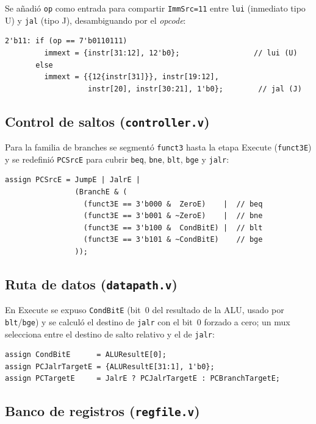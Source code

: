 \documentclass[11pt,a4paper]{article}
\begin{document}
Se añadió \texttt{op} como entrada para compartir \texttt{ImmSrc=11} entre \texttt{lui}
(inmediato tipo U) y \texttt{jal} (tipo J), desambiguando por el \textit{opcode}:

\begin{lstlisting}
2'b11: if (op == 7'b0110111)
         immext = {instr[31:12], 12'b0};                 // lui (U)
       else
         immext = {{12{instr[31]}}, instr[19:12],
                   instr[20], instr[30:21], 1'b0};        // jal (J)
\end{lstlisting}

\subsection{Control de saltos (\texttt{controller.v})}

Para la familia de branches se segmentó \texttt{funct3} hasta la etapa Execute
(\texttt{funct3E}) y se redefinió \texttt{PCSrcE} para cubrir \texttt{beq}, \texttt{bne},
\texttt{blt}, \texttt{bge} y \texttt{jalr}:

\begin{lstlisting}
assign PCSrcE = JumpE | JalrE |
                (BranchE & (
                  (funct3E == 3'b000 &  ZeroE)    |  // beq
                  (funct3E == 3'b001 & ~ZeroE)    |  // bne
                  (funct3E == 3'b100 &  CondBitE) |  // blt
                  (funct3E == 3'b101 & ~CondBitE)    // bge
                ));
\end{lstlisting}

\subsection{Ruta de datos (\texttt{datapath.v})}

En Execute se expuso \texttt{CondBitE} (bit~0 del resultado de la ALU, usado por
\texttt{blt}/\texttt{bge}) y se calculó el destino de \texttt{jalr} con el bit~0 forzado
a cero; un mux selecciona entre el destino de salto relativo y el de \texttt{jalr}:

\begin{lstlisting}
assign CondBitE      = ALUResultE[0];
assign PCJalrTargetE = {ALUResultE[31:1], 1'b0};
assign PCTargetE     = JalrE ? PCJalrTargetE : PCBranchTargetE;
\end{lstlisting}

\subsection{Banco de registros (\texttt{regfile.v})}
\end{document}

